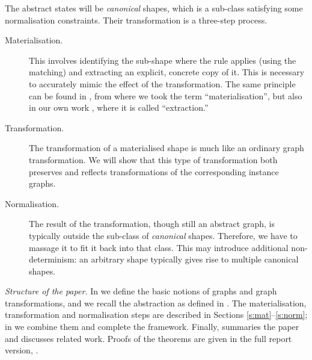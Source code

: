 The abstract states will be \emph{canonical} shapes, which is a sub-class
satisfying some normalisation constraints. Their transformation is a three-step process.
%
\begin{description}%
\item[Materialisation.] This involves identifying the sub-shape where the rule
  applies (using the matching) and extracting an explicit, concrete copy of it.
  This is necessary to accurately mimic the effect of the transformation. The
  same principle can be found in \cite{SagRepWil98}, from where we took the
  term ``materialisation'', but also in our own work
  \cite{DisRenKat02,DisKatRen04}, where it is called ``extraction.''
  
\item[Transformation.] The transformation of a materialised shape is much like
  an ordinary graph transformation. We will show that this type of
  transformation both preserves and reflects transformations of the
  corresponding instance graphs.
  
\item[Normalisation.] The result of the transformation, though still an
  abstract graph, is typically outside the sub-class of \emph{canonical}
  shapes. Therefore, we have to massage it to fit it back into that class. This
  may introduce additional non-determinism: an arbitrary shape typically gives
  rise to multiple canonical shapes.
\end{description}
%
\emph{Structure of the paper.}  In  we define the basic notions of
graphs and graph transformations, and we recall the abstraction as defined in
\cite{Rens04-esop}. The materialisation, transformation and normalisation steps
are described in Sections \ref{s:mat}--\ref{s:norm}; in  we
combine them and complete the framework. Finally, 
summaries the paper and discusses related work. Proofs of the theorems are
given in the full report version, \cite{RensinkDis2005a}.


